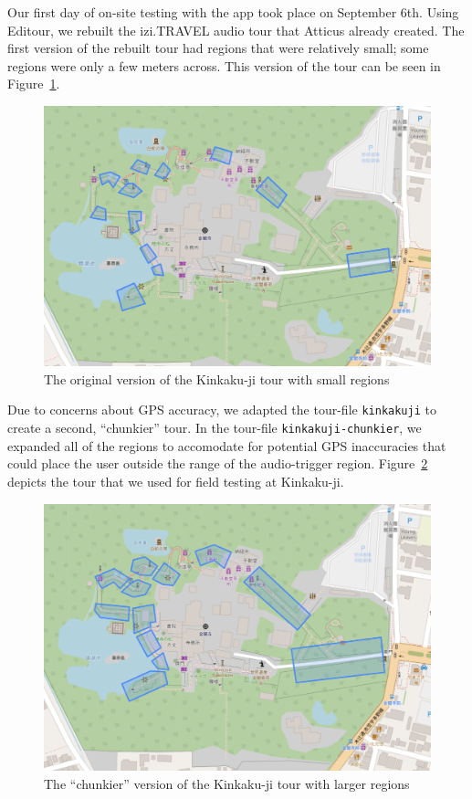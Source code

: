 \documentclass[a4paper, 10pt, american, titlepage]{article}
\begin{document}
Our first day of on-site testing with the app took place on September 6th.
Using Editour, we rebuilt the izi.TRAVEL audio tour that Atticus already
created. The first version of the rebuilt tour had regions that were relatively
small; some regions were only a few meters across. This version of the tour can
be seen in Figure~\ref{fig:kinkakujiTour}.

\begin{figure}[h]
	\centering
	\includegraphics[width=\textwidth]{kinkakuji-tour.png}
	\caption[The original version of the Kinkaku-ji tour]{The original version
		of the Kinkaku-ji tour with small regions}
	\label{fig:kinkakujiTour}
\end{figure}

Due to concerns about GPS accuracy, we adapted the tour-file \texttt{kinkakuji}
to create a second, ``chunkier'' tour.  In the tour-file
\texttt{kinkakuji-chunkier}, we expanded all of the regions to accomodate for
potential GPS inaccuracies that could place the user outside the range of the
audio-trigger region.  Figure~\ref{fig:kinkakujiChunkierTour} depicts the tour
that we used for field testing at Kinkaku-ji.

\begin{figure}[h]
	\centering
	\includegraphics[width=\textwidth]{kinkakuji-chunkier-tour.png}
	\caption[The ``chunkier'' version of the Kinkaku-ji tour]{The ``chunkier''
		version of the Kinkaku-ji tour with larger regions}
	\label{fig:kinkakujiChunkierTour}
\end{figure}
\end{document}
